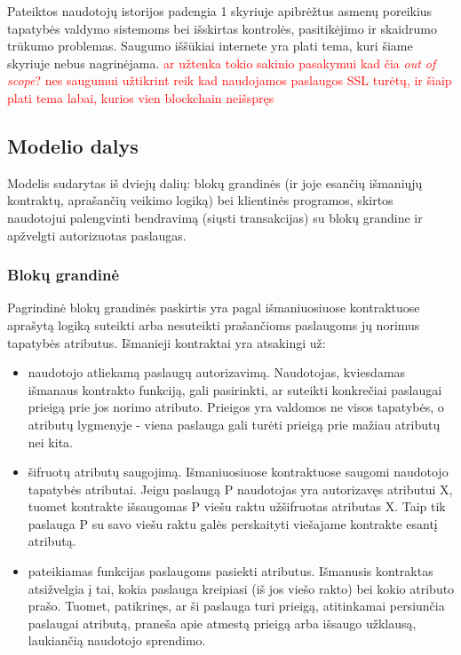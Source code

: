 Pateiktos naudotojų istorijos padengia 1 skyriuje apibrėžtus asmenų poreikius tapatybės valdymo
sistemoms bei išskirtas kontrolės, pasitikėjimo ir skaidrumo trūkumo problemas. Saugumo iššūkiai internete
yra plati tema, kuri šiame skyriuje nebus nagrinėjama. \textcolor{red}{ar užtenka tokio sakinio pasakymui kad čia \textit{out of scope}? nes saugumui užtikrint reik
kad naudojamos paslaugos SSL turėtų, ir šiaip plati tema labai, kurios vien blockchain neišspręs}

\subsection{Modelio dalys}

Modelis sudarytas iš dviejų dalių: blokų grandinės (ir joje esančių išmaniųjų kontraktų, aprašančių veikimo logiką)
bei klientinės programos, skirtos naudotojui palengvinti bendravimą (siųsti transakcijas) su blokų grandine ir apžvelgti
autorizuotas paslaugas.

\subsubsection{Blokų grandinė} \label{BCIDM:blockchainFunctions}

Pagrindinė blokų grandinės paskirtis yra pagal išmaniuosiuose kontraktuose aprašytą logiką suteikti arba nesuteikti
prašančioms paslaugoms jų norimus tapatybės atributus. Išmanieji kontraktai yra atsakingi už:

\begin{itemize}
    \item naudotojo atliekamą paslaugų autorizavimą. Naudotojas, kviesdamas išmanaus kontrakto funkciją, gali pasirinkti,
    ar suteikti konkrečiai paslaugai prieigą prie jos norimo atributo. Prieigos yra valdomos ne visos tapatybės, o atributų lygmenyje -
    viena paslauga gali turėti prieigą prie mažiau atributų nei kita.

    \item šifruotų atributų saugojimą. Išmaniuosiuose kontraktuose saugomi naudotojo tapatybės atributai. Jeigu paslaugą P
    naudotojas yra autorizavęs atributui X, tuomet kontrakte išsaugomas P viešu raktu užšifruotas atributas X. Taip tik paslauga P
    su savo viešu raktu galės perskaityti viešajame kontrakte esantį atributą.

    \item pateikiamas funkcijas paslaugoms pasiekti atributus. Išmanusis kontraktas atsižvelgia į tai, kokia paslauga kreipiasi (iš
    jos viešo rakto) bei kokio atributo prašo. Tuomet, patikrinęs, ar ši paslauga turi prieigą, atitinkamai persiunčia
    paslaugai atributą, praneša apie atmestą prieigą arba išsaugo užklausą, laukiančią naudotojo sprendimo.
\end{itemize}

